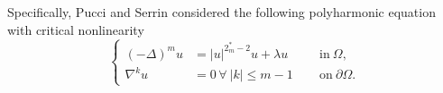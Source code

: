 \documentclass[reqno]{amsart}
\newcommand{\la} {\lambda}
\newcommand{\Om}{\Omega}
\numberwithin{theorem}{section} \numberwithin{equation}{section}
\begin{document}
Specifically, Pucci and Serrin\cite{36pucci1986general} considered the following  polyharmonic equation with critical nonlinearity
\begin{equation}\label{e55}
\left\{
\begin{aligned}
(-\Delta)^m u &= |u|^{2^*_{m}-2}u + \lambda u &&  \text{ in}\  \Om, \\
 {\nabla}^k u&=0 \,  \forall \ |k|\leq m-1 \,&& \text{ on} \ \partial\Om.
\end{aligned}\right.
\end{equation}
\end{document}

